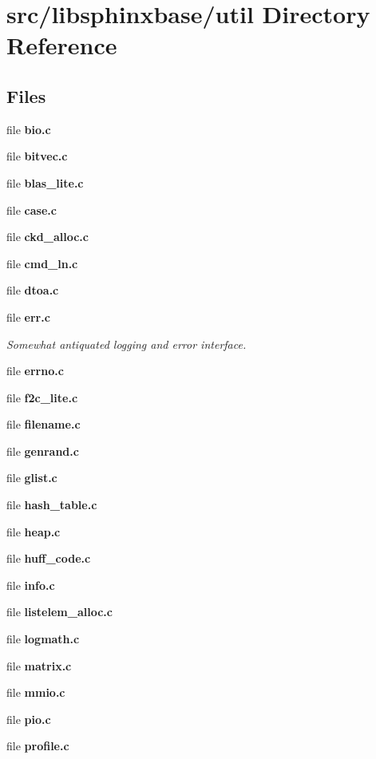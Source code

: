 \section{src/libsphinxbase/util Directory Reference}
\label{dir_dc1f04dceb148346198172cb52290701}
\subsection*{Files}
\begin{DoxyCompactItemize}
\item 
file {\bfseries bio.\-c}
\item 
file {\bfseries bitvec.\-c}
\item 
file {\bfseries blas\-\_\-lite.\-c}
\item 
file {\bfseries case.\-c}
\item 
file {\bfseries ckd\-\_\-alloc.\-c}
\item 
file {\bfseries cmd\-\_\-ln.\-c}
\item 
file {\bfseries dtoa.\-c}
\item 
file {\bf err.\-c}
\begin{DoxyCompactList}\small\item\em Somewhat antiquated logging and error interface. \end{DoxyCompactList}\item 
file {\bfseries errno.\-c}
\item 
file {\bfseries f2c\-\_\-lite.\-c}
\item 
file {\bfseries filename.\-c}
\item 
file {\bfseries genrand.\-c}
\item 
file {\bfseries glist.\-c}
\item 
file {\bfseries hash\-\_\-table.\-c}
\item 
file {\bfseries heap.\-c}
\item 
file {\bfseries huff\-\_\-code.\-c}
\item 
file {\bfseries info.\-c}
\item 
file {\bfseries listelem\-\_\-alloc.\-c}
\item 
file {\bfseries logmath.\-c}
\item 
file {\bfseries matrix.\-c}
\item 
file {\bfseries mmio.\-c}
\item 
file {\bfseries pio.\-c}
\item 
file {\bfseries profile.\-c}
\item 

\end{DoxyCompactItemize}
